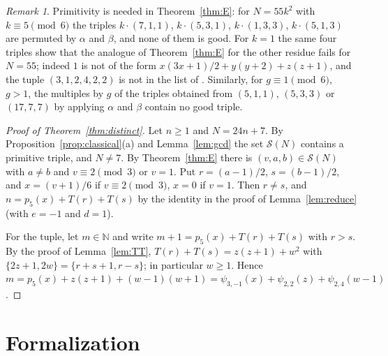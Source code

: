 \documentclass[11pt]{amsart}
\theoremstyle{definition}
\theoremstyle{remark}
\newtheorem{remark}[theorem]{Remark}
\newcommand{\N}{\mathbb{N}}
\newcommand{\cS}{\mathcal{S}}
\newcommand{\Tr}{T}
\begin{document}
\begin{remark}\label{rem:primitive}
Primitivity is needed in Theorem~\ref{thm:E}: for $N=55k^2$ with $k\equiv 5\pmod 6$ the triples $k\cdot(7,1,1)$, $k\cdot(5,3,1)$, $k\cdot(1,3,3)$, $k\cdot(5,1,3)$
are permuted by $\alpha$ and $\beta$, and none of them is good. For $k=1$ the same four triples show that the analogue of Theorem~\ref{thm:E} for the other residue fails for $N=55$;
indeed $1$ is not of the form $x(3x+1)/2+y(y+2)+z(z+1)$, and the tuple $(3,1,2,4,2,2)$ is not in the list of \cite{S20}.
Similarly, for $g\equiv 1\pmod 6$, $g>1$, the multiples by $g$ of the triples obtained from $(5,1,1)$, $(5,3,3)$ or $(17,7,7)$ by applying $\alpha$ and $\beta$ contain no good triple.
\end{remark}

\begin{proof}[Proof of Theorem~\ref{thm:distinct}]
Let $n\ge 1$ and $N=24n+7$. By Proposition~\ref{prop:classical}(a) and Lemma~\ref{lem:gcd} the set $\cS(N)$ contains a primitive triple, and $N\ne 7$.
By Theorem~\ref{thm:E} there is $(v,a,b)\in\cS(N)$ with $a\ne b$ and $v\equiv 2\pmod 3$ or $v=1$.
Put $r=(a-1)/2$, $s=(b-1)/2$, and $x=(v+1)/6$ if $v\equiv 2\pmod 3$, $x=0$ if $v=1$. Then $r\ne s$, and $n=p_5(x)+\Tr(r)+\Tr(s)$ by the identity in the proof of Lemma~\ref{lem:reduce} (with $e=-1$ and $d=1$).

For the tuple, let $m\in\N$ and write $m+1=p_5(x)+\Tr(r)+\Tr(s)$ with $r>s$. By the proof of Lemma~\ref{lem:TT}, $\Tr(r)+\Tr(s)=z(z+1)+w^2$ with $\{2z+1,2w\}=\{r+s+1,r-s\}$; in particular $w\ge 1$.
Hence $m=p_5(x)+z(z+1)+(w-1)(w+1)=\psi_{3,-1}(x)+\psi_{2,2}(z)+\psi_{2,4}(w-1)$.
\end{proof}

\section{Formalization}\label{sec:lean}
\end{document}
